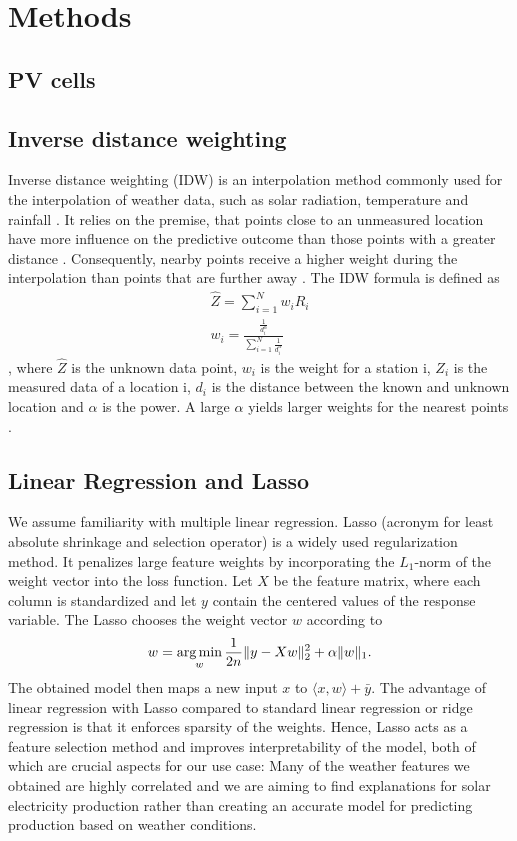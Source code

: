 \documentclass{article}
\begin{document}
\section{Methods}

\subsection{PV cells}

\subsection{Inverse distance weighting}
Inverse distance weighting (IDW) is an interpolation method commonly used for the interpolation of weather data, such as solar radiation, temperature and rainfall \cite{Loghmari2018} \cite{Cao2009} \cite{Chen2012}. It relies on the premise, that points close to an unmeasured location have more influence on the predictive outcome than those points with a greater distance \cite{Chen2012}. Consequently, nearby points receive a higher weight during the interpolation than points that are further away \cite{Lu2008}. The IDW formula is defined as
\begin{align}
    \hat{Z} = \sum_{i=1}^N w_iR_i \\
    w_i = \frac{\frac{1}{d_i^\alpha}}{\sum_{i=1}^N \frac{1}{d_i^\alpha}}
\end{align} \cite{Chen2012},
 where $\hat{Z}$ is the unknown data point, $w_i$ is the weight for a station i, $Z_i$ is the measured data of a location i, $d_i$ is the distance between the known and unknown location and $\alpha$ is the power.
  A large $\alpha$ yields larger weights for the nearest points \cite{Lu2008}.

\subsection{Linear Regression and Lasso}
We assume familiarity with multiple linear regression. Lasso (acronym for least absolute shrinkage and selection operator) is a widely used regularization method. It penalizes large feature weights by incorporating the $L_1$-norm of the weight vector into the loss function. Let $X$ be the feature matrix, where each column is standardized and let $y$ contain the centered values of the response variable. The Lasso chooses the weight vector $w$ according to
\begin{equation*}
	w = \underset{w}{\text{arg\,min}} \, \frac{1}{2n} \|y - Xw\|_2^2 + \alpha \|w\|_1.
\end{equation*}
The obtained model then maps a new input $x$ to $\langle x,w \rangle + \bar{y}$. The advantage of linear regression with Lasso compared to standard linear regression or ridge regression is that it enforces sparsity of the weights. Hence, Lasso acts as a feature selection method and improves interpretability of the model, both of which are crucial aspects for our use case: Many of the weather features we obtained are highly correlated and we are aiming to find explanations for solar electricity production rather than creating an accurate model for predicting production based on weather conditions.
\end{document}
